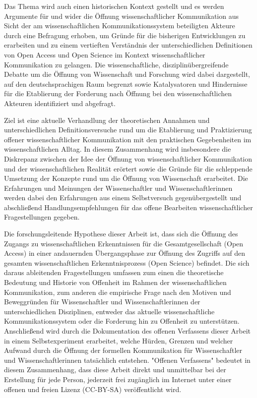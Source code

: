 Das Thema wird auch einen historischen Kontext gestellt und es werden Argumente für und wider die Öffnung wissenschaftlicher Kommunikation aus Sicht der am wissenschaftlichen Kommunikationssystem beteiligten Akteure durch eine Befragung erhoben, um Gründe für die bisherigen Entwicklungen zu erarbeiten und zu einem vertieften Verständnis der unterschiedlichen Definitionen von Open Access und Open Science im Kontext wissenschaftlicher Kommunikation zu gelangen. Die wissenschaftliche, disziplinübergreifende Debatte um die Öffnung von Wissenschaft und Forschung wird dabei dargestellt, auf den deutschsprachigen Raum begrenzt sowie Katalysatoren und Hindernisse für die Etablierung der Forderung nach Öffnung bei den wissenschaftlichen Akteuren identifiziert und abgefragt.

Ziel ist eine aktuelle Verhandlung der theoretischen Annahmen und unterschiedlichen Definitionsversuche rund um die Etablierung und Praktizierung offener wissenschaftlicher Kommunikation mit den praktischen Gegebenheiten im wissenschaftlichen Alltag. In diesem Zusammenhang wird insbesondere die Diskrepanz zwischen der Idee der Öffnung von wissenschaftlicher Kommunikation und der wissenschaftlichen Realität \cite{Scheliga_2014} erörtert sowie die Gründe für die schleppende Umsetzung der Konzepte rund um die Öffnung von Wissenschaft erarbeitet. Die Erfahrungen und Meinungen der Wissenschaftler und Wissenschaftlerinnen werden dabei den Erfahrungen aus einem Selbstversuch gegenübergestellt und abschließend Handlungsempfehlungen für das offene Bearbeiten wissenschaftlicher Fragestellungen gegeben.

Die forschungsleitende Hypothese dieser Arbeit ist, dass sich die Öffnung des Zugangs zu wissenschaftlichen Erkenntnissen für die Gesamtgesellschaft (Open Access) in einer andauernden Übergangsphase zur Öffnung des Zugriffs auf den gesamten wissenschaftlichen Erkenntnisprozess (Open Science) befindet. Die sich daraus ableitenden Fragestellungen umfassen zum einen die theoretische Bedeutung und Historie von Offenheit im Rahmen der wissenschaftlichen Kommunikation, zum anderen die empirische Frage nach den Motiven und Beweggründen für Wissenschaftler und Wissenschaftlerinnen der unterschiedlichen Disziplinen, entweder das aktuelle wissenschaftliche Kommunikationssystem oder die Forderung hin zu Offenheit zu unterstützen. Anschließend wird durch die Dokumentation des offenen Verfassens dieser Arbeit in einem Selbstexperiment erarbeitet, welche Hürden, Grenzen und welcher Aufwand durch die Öffnung der formellen Kommunikation für Wissenschaftler und Wissenschaftlerinnen tatsächlich entstehen. "Offenen Verfassens" bedeutet in diesem Zusammenhang, dass diese Arbeit direkt und unmittelbar bei der Erstellung für jede Person, jederzeit frei zugänglich im Internet unter einer offenen und freien Lizenz (CC-BY-SA) veröffentlicht wird.

